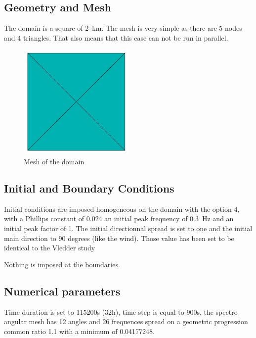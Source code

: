 \subsection{Geometry and Mesh}
%
The domain is a square of 2~km.
The mesh is very simple as there are 5 nodes and 4 triangles. That also means that this case can not be run in parallel.
\begin{figure} [!h]
\centering
\includegraphics[width=0.5\textwidth]{maillage.png}
 \caption{Mesh of the domain}
\label{mailTW}
\end{figure}
%
%
\subsection{Initial and Boundary Conditions}
%
Initial conditions are imposed homogeneous on the domain with the option 4, with a Phillips constant of 0.024 an initial peak frequency of 0.3~Hz  and an initial peak factor of 1.  The initial directionnal spread is set to one and the initial main direction to 90 degrees (like the wind).
Those value has been set to be identical to the Vledder study \cite{Vanvledder1990}

Nothing is imposed at the boundaries.
%
%
\subsection{Numerical parameters}
Time duration is set to 115200s (32h), time step is equal to 900s, the spectro-angular mesh has 12 angles and 26 frequences spread on a geometric progression common ratio 1.1 with a minimum of 0.04177248.

%
%
